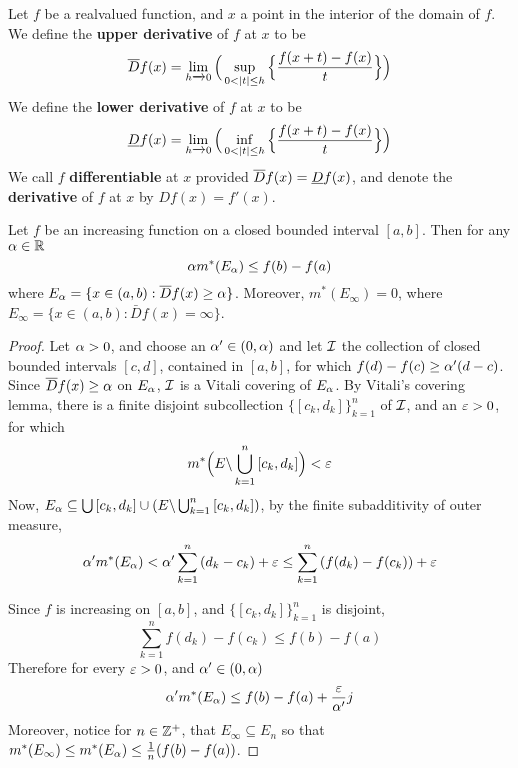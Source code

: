 \begin{definition}
    Let $f$ be a realvalued function, and  $x$ a point in the interior of the
    domain of  $f$. We define the  \textbf{upper derivative} of $f$ at  $x$ to
    be
    \begin{equation*}
        \bar{D}{f(x)}=\lim_{h \xrightarrow{} 0}
        \Big{(}\sup_{0<|t| \leq h}{\Big{\{} \frac{f(x+t)-f(x)}{t}\Big{\}}} \Big{)}
    \end{equation*}
    We define the \textbf{lower derivative} of $f$ at $x$ to be
    \begin{equation*}
        \bbar{D}{f(x)}=\lim_{h \xrightarrow{} 0}
        \Big{(}\inf_{0<|t| \leq h}{\Big{\{} \frac{f(x+t)-f(x)}{t}\Big{\}}} \Big{)}
    \end{equation*}
    We call $f$  \textbf{differentiable} at $x$ provided
    $\overline{D}{f(x)}=\underline{D}{f(x)}$, and denote the \textbf{derivative} of $f$ at
     $x$ by  $D{f(x)}=f'(x)$.
\end{definition}

\begin{lemma}\label{11.1.2}
    Let $f$ be an increasing function on a closed bounded interval  $[a,b]$.
    Then for any $\alpha \in \mathbb{R}$
    \begin{equation*}
        \alpha{m^\ast(E_\alpha)} \leq f(b)-f(a)
    \end{equation*}
    where $E_\alpha=\{x \in (a,b) : \overline{D}{f(x)} \geq \alpha\}$. Moreover,
    $m^\ast(E_\infty)=0$, where $E_\infty=\{x \in (a,b) :
    \bar{D}{f(x)}=\infty\}$.
\end{lemma}
\begin{proof}
    Let $\alpha>0$, and choose an  $\alpha' \in (0,\alpha)$ and let $\mathcal{I}$ the collection of
    closed bounded intervals $[c,d]$, contained in $[a,b]$, for which $f(d)-f(c)
    \geq \alpha'(d-c)$. Since $\overline{D}{f(x)} \geq \alpha$ on $E_\alpha$,  $\mathcal{I}$ is a Vitali
    covering of  $E_\alpha$. By Vitali's covering lemma, there is a finite disjoint
    subcollection $\{[c_k,d_k]\}_{k=1}^n$ of $\mathcal{I}$, and an $\varepsilon>0$, for which
    \begin{equation*}
        m^\ast\Big{(} E \backslash \bigcup_{k=1}^n{[c_k,d_k]} \Big{)}<\varepsilon
    \end{equation*}
    Now, $E_\alpha \subseteq \bigcup{[c_k,d_k]} \cup
    (E \backslash \bigcup_{k=1}^n{[c_k,d_k]})$, by the finite subadditivity of
    outer measure,
    \begin{equation*}
        \alpha'm^\ast(E_\alpha)<\alpha'\sum_{k=1}^n{(d_k-c_k)}+\varepsilon \leq
        \sum_{k=1}^n{(f(d_k)-f(c_k))}+\varepsilon
    \end{equation*}

    Since $f$ is increasing on  $[a,b]$, and $\{[c_k,d_k]\}_{k=1}^n$ is disjoint,
    \begin{equation*}
        \sum_{k=1}^n{f(d_k)-f(c_k)} \leq f(b)-f(a)
    \end{equation*}
    Therefore for every $\varepsilon>0$, and  $\alpha' \in (0,\alpha)$
    \begin{equation*}
        \alpha'm^\ast(E_\alpha) \leq f(b)-f(a)+\frac{\varepsilon}{\alpha'}j
    \end{equation*}
    Moreover, notice for $n \in \mathbb{Z}^+$, that $E_\infty \subseteq E_n$ so that
    $m^\ast(E_\infty) \leq m^\ast(E_\alpha)\leq \frac{1}{n}(f(b)-f(a))$.
\end{proof}

